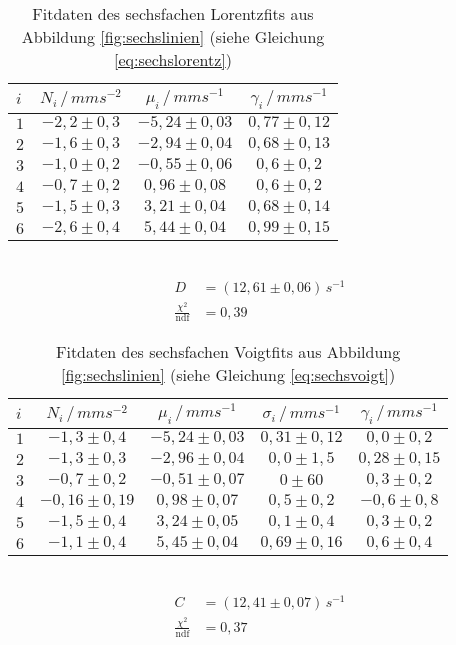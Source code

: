 \begin{table}[h!]
	\centering
	\begin{tabular}{l|ccc}
		$i$&$N_i\,/\,\si{mms^{-2}}$&$\mu_i\,/\,\si{mms^{-1}}$&$\gamma_i\,/\,\si{mms^{-1}}$\\\hline
		$1$&$-2,2\pm0,3$&$-5,24\pm0,03$&$0,77\pm0,12$\\
		$2$&$-1,6\pm0,3$&$-2,94\pm0,04$&$0,68\pm0,13$\\
		$3$&$-1,0\pm0,2$&$-0,55\pm0,06$&$0,6 \pm0,2$\\
		$4$&$-0,7\pm0,2$&$ 0,96\pm0,08$&$0,6 \pm0,2$\\
		$5$&$-1,5\pm0,3$&$ 3,21\pm0,04$&$0,68\pm0,14$\\
		$6$&$-2,6\pm0,4$&$ 5,44\pm0,04$&$0,99\pm0,15$\\
	\end{tabular}\\
	\begin{align*}
	D&=(12,61\pm0,06)\,\si{s^{-1}}\\
	\frac{\chi^2}{\mathrm{ndf}}&=0,39
	\end{align*}
	\caption{Fitdaten des sechsfachen Lorentzfits aus Abbildung \ref{fig:sechslinien} (siehe Gleichung \ref{eq:sechslorentz})}
	\label{tab:sechslorentz}
\end{table}

\begin{table}[h!]
	\centering
	\begin{tabular}{l|cccc}
		$i$&$N_i\,/\,\si{mms^{-2}}$&$\mu_i\,/\,\si{mms^{-1}}$&$\sigma_i\,/\,\si{mms^{-1}}$&$\gamma_i\,/\,\si{mms^{-1}}$\\\hline
		$1$&$-1,3\pm0,4$&$-5,24\pm0,03$&$0,31 \pm0,12$&$0,0 \pm0,2$\\
		$2$&$-1,3\pm0,3$&$-2,96\pm0,04$&$0,0  \pm1,5$ &$0,28\pm0,15$\\
		$3$&$-0,7\pm0,2$&$-0,51\pm0,07$&$0    \pm60$  &$0,3 \pm0,2$\\
		$4$&$-0,16\pm0,19$&$ 0,98\pm0,07$&$0,5\pm0,2$ &$-0,6\pm0,8$\\
		$5$&$-1,5\pm0,4$&$ 3,24\pm0,05$&$0,1  \pm0,4$ &$0,3 \pm0,2$\\
		$6$&$-1,1\pm0,4$&$ 5,45\pm0,04$&$0,69 \pm0,16$&$0,6\pm0,4$\\
	\end{tabular}\\
	\begin{align*}
		C&=(12,41\pm0,07)\,\si{s^{-1}}\\
		\frac{\chi^2}{\mathrm{ndf}}&=0,37
	\end{align*}
	\caption{Fitdaten des sechsfachen Voigtfits aus Abbildung \ref{fig:sechslinien} (siehe Gleichung \ref{eq:sechsvoigt})}
	\label{tab:sechsvoigt}
\end{table}